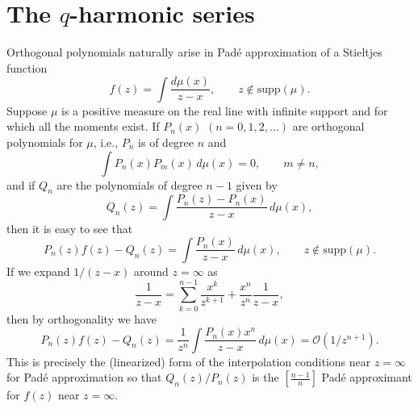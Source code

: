 \documentclass[12pt]{article}
\begin{document}
\section{The $q$-harmonic series}

Orthogonal polynomials naturally arise in Pad\'e approximation of a
Stieltjes function
\begin{equation}  \label{eq:markov} 
  f(z) = \int \frac{d\mu(x)}{z-x}, \qquad z \notin \textrm{supp}(\mu).
\end{equation}
Suppose $\mu$ is a positive measure on the real line with infinite
support and for which all the moments exist. If $P_n(x)$ $(n = 0,1,2,\ldots)$
are orthogonal polynomials for $\mu$, i.e., $P_n$ is of degree $n$ and
\[  \int P_n(x)P_m(x)\, d\mu(x) = 0, \qquad m\neq n,  \]
and if $Q_n$ are the polynomials of degree $n-1$ given by
\begin{equation}  \label{eq:Qn}
  Q_n(z) = \int \frac{P_n(z)-P_n(x)}{z-x} \, d\mu(x), 
\end{equation}
then it is easy to see that
\begin{equation}  \label{eq:pade}
  P_n(z) f(z) - Q_n(z) = \int \frac{P_n(x)}{z-x} \, d\mu(x), 
  \qquad z \notin \textrm{supp}(\mu).   
\end{equation}        
If we expand $1/(z-x)$ around $z=\infty$ as
\[   \frac{1}{z-x} = \sum_{k=0}^{n-1} \frac{x^k}{z^{k+1}}
    + \frac{x^n}{z^n} \frac{1}{z-x} , \]
then by orthogonality we have
\[   P_n(z) f(z) - Q_n(z) = \frac{1}{z^n} \int \frac{P_n(x) x^n}{z-x}\, d\mu(x)
    = \mathcal{O}(1/z^{n+1}). \]
This is precisely the (linearized) form of the interpolation conditions near
$z=\infty$ for Pad\'e approximation so that $Q_n(z)/P_n(z)$ is the 
$[\frac{n-1}{n}]$ Pad\'e
approximant for $f(z)$ near $z=\infty$. 
\end{document}
